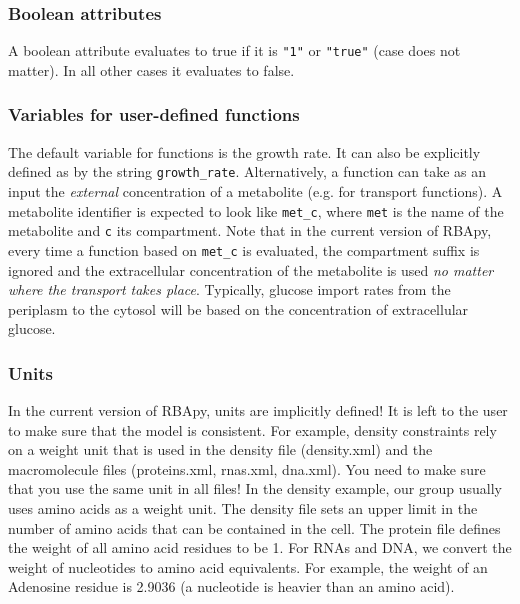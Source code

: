 \documentclass[12pt]{scrartcl}
\begin{document}
\subsubsection{Boolean attributes}

A boolean attribute evaluates to true if it is \texttt{"1"}
or \texttt{"true"} (case does not matter).
In all other cases it evaluates to false.

\subsubsection{Variables for user-defined functions}

The default variable for functions is the growth rate.
It can also be explicitly defined as by the string \texttt{growth\_rate}.
Alternatively, a function can take as an input the \emph{external}
concentration of a metabolite (e.g. for transport functions).
A metabolite identifier is expected to look like \texttt{met\_c},
where \texttt{met} is the name of the metabolite
and \texttt{c} its compartment.
Note that in the current version of RBApy,
every time a function based on \texttt{met\_c} is evaluated,
the compartment suffix is ignored and the extracellular concentration of the metabolite is used
\emph{no matter where the transport takes place}.
Typically, glucose import rates from the periplasm to the cytosol
will be based on the concentration of extracellular glucose.

\subsubsection{Units}

In the current version of RBApy, units are implicitly defined!
It is left to the user to make sure that the model is consistent.
For example, density constraints rely on a weight unit that is used in the
density file (density.xml) and the macromolecule files (proteins.xml, rnas.xml,
dna.xml).
You need to make sure that you use the same unit in all files!
In the density example, our group usually uses amino acids as a weight unit.
The density file sets an upper limit in the number of amino acids that can be
contained in the cell.
The protein file defines the weight of all amino acid residues to be 1.
For RNAs and DNA, we convert the weight of nucleotides to amino acid equivalents.
For example, the weight of an Adenosine residue is 2.9036
(a nucleotide is heavier than an amino acid).








\end{document}
